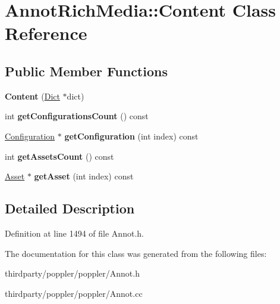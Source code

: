 \hypertarget{class_annot_rich_media_1_1_content}{}\section{Annot\+Rich\+Media\+:\+:Content Class Reference}
\label{class_annot_rich_media_1_1_content}
\subsection*{Public Member Functions}
\begin{DoxyCompactItemize}
\item 
\mbox{\label{class_annot_rich_media_1_1_content_a02ebe9e96234589c99fd44efc2a567ef}} 
{\bfseries Content} (\hyperlink{class_dict}{Dict} $\ast$dict)
\item 
\mbox{\label{class_annot_rich_media_1_1_content_a76f6bf9eccd943c3b959d5f19b360349}} 
int {\bfseries get\+Configurations\+Count} () const
\item 
\mbox{\label{class_annot_rich_media_1_1_content_a8b65bf8b5055b2e1036493bb50fbcb33}} 
\hyperlink{class_annot_rich_media_1_1_configuration}{Configuration} $\ast$ {\bfseries get\+Configuration} (int index) const
\item 
\mbox{\label{class_annot_rich_media_1_1_content_a83b03a0584d4daece221d16ee285ffea}} 
int {\bfseries get\+Assets\+Count} () const
\item 
\mbox{\label{class_annot_rich_media_1_1_content_a1e5f982a03e82bd89d8cdac2999bbed4}} 
\hyperlink{class_annot_rich_media_1_1_asset}{Asset} $\ast$ {\bfseries get\+Asset} (int index) const
\end{DoxyCompactItemize}


\subsection{Detailed Description}


Definition at line 1494 of file Annot.\+h.



The documentation for this class was generated from the following files\+:\begin{DoxyCompactItemize}
\item 
thirdparty/poppler/poppler/Annot.\+h\item 
thirdparty/poppler/poppler/Annot.\+cc\end{DoxyCompactItemize}
